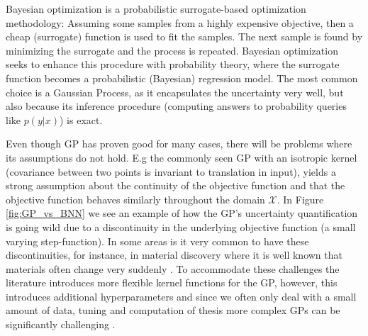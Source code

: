 Bayesian optimization is a probabilistic surrogate-based optimization methodology: Assuming some samples from a
highly expensive objective, then a cheap (surrogate) function is used to fit the samples. The next sample
is found by minimizing the surrogate and the process is repeated. Bayesian optimization seeks to
enhance this procedure with probability theory, where the surrogate function becomes a probabilistic (Bayesian)
regression model. The most common choice is a Gaussian Process, as it encapsulates the uncertainty very well,
but also because its inference procedure (computing answers to probability queries like $p(y|x)$) is exact.


Even though GP has proven good for many cases, there will be problems where its assumptions do not
hold. E.g the commonly seen GP with an isotropic kernel (covariance between two points is invariant
to translation in input), yields a strong assumption about the continuity of the objective function
and that the objective function behaves similarly throughout the domain $\mathcal{X}$. In Figure
\ref{fig:GP_vs_BNN} we see an example of how the GP's uncertainty quantification is going wild due
to a discontinuity in the underlying objective function (a small varying step-function). In some
areas is it very common to have these discontinuities, for instance, in material discovery where it
is well known that materials often change very suddenly \cite{Nature_BO_paper}. To accommodate these
challenges the literature introduces more flexible kernel functions for the GP, however, this
introduces additional hyperparameters and since we often only deal with a small amount of data,
tuning and computation of thesis more complex GPs can be significantly challenging \cite{Nature_BO_paper}.


